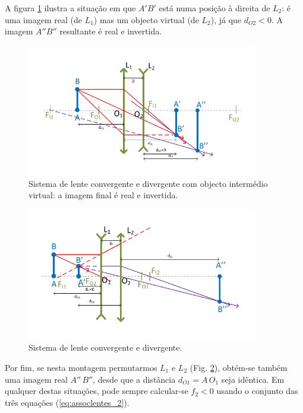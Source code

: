 \documentclass[a4paper,12pt]{article}      %
\begin{document}
A figura \ref{fig:DuplaConvDiv2} ilustra a situação em que $A'B'$ está numa posição à direita de $L_2$: é uma imagem real (de $L_1$) mas um objecto virtual (de $L_2$), já que $d_{O2}<0$. A imagem $A''B''$ resultante é real e invertida.

\begin{figure}	[!htb] 
\begin{center}
	\includegraphics[width=0.9\textwidth]{12-DuplaConvDiv2}
	\caption{Sistema de lente convergente e divergente com objecto intermédio virtual: a imagem final é real e invertida. \label{fig:DuplaConvDiv2}} 
\end{center}
\end{figure}

\begin{figure}	[!htb]  
\begin{center}
	\includegraphics[width=0.9\textwidth]{13-DuplaConvDiv3}
\end{center}
	\caption{Sistema de lente convergente e divergente.  \label{fig:DuplaConvDiv3}} 
\end{figure}


Por fim, se nesta montagem permutarmos $L_1$ e $L_2$ (Fig. \ref{fig:DuplaConvDiv3}), obtém-se também uma imagem real  $A''\,B''$, desde que a distância $d_{O1}=A\,O_1$ seja idêntica.
Em qualquer destas situações, pode sempre calcular-se $f_2 < 0$ usando o conjunto das três equações (\ref{eq:assoclentes_2}).
\clearpage
\end{document}

